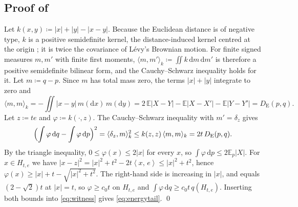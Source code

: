 \documentclass[11pt]{article}
\theoremstyle{plain}
\theoremstyle{definition}
\theoremstyle{remark}
\newcommand{\E}{\mathbb{E}}
\newcommand{\Dd}{\mathrm{d}}
\newcommand{\define}{\coloneqq}
\newcommand{\DE}{D_{\mathrm{E}}}
\newcommand{\IP}[2]{\left\langle #1,\, #2 \right\rangle}
\newcommand{\abs}[1]{\left\lvert #1 \right\rvert}
\begin{document}
\subsection{Proof of \texorpdfstring{}{Lemma 4.22}}
\label{app:energytail}
Let $k(x,y)\define\abs{x}+\abs{y}-\abs{x-y}$. Because the Euclidean distance
is of negative type, $k$ is a positive semidefinite kernel, the
distance-induced kernel centred at the origin \cite{sejdinovic2013equivalence};
it is twice the covariance of L\'evy's Brownian motion. For finite signed measures $m,m'$
with finite first moments, $\langle m,m'\rangle_k\define\iint k\,\Dd m\,\Dd m'$
is therefore a positive semidefinite bilinear form, and the Cauchy--Schwarz
inequality holds for it. Let $m\define q-p$. Since $m$ has total mass zero,
the terms $\abs{x}+\abs{y}$ integrate to zero and
\begin{equation*}
 \langle m,m\rangle_k=-\iint\abs{x-y}\,m(\Dd x)\,m(\Dd y)
 =2\,\E\abs{X-Y}-\E\abs{X-X'}-\E\abs{Y-Y'}=\DE(p,q).
\end{equation*}
Let $z\define te$ and $\varphi\define k(\cdot,z)$. The Cauchy--Schwarz
inequality with $m'=\delta_z$ gives
\begin{equation}
 \Bigl(\int\varphi\,\Dd q-\int\varphi\,\Dd p\Bigr)^{2}
 =\langle\delta_z,m\rangle_k^{2}\le k(z,z)\,\langle m,m\rangle_k=2t\,\DE(p,q).
 \label{eq:witness}
\end{equation}
By the triangle inequality, $0\le\varphi(x)\le2\abs{x}$ for every $x$, so
$\int\varphi\,\Dd p\le2\E_p\abs{X}$. For $x\in H_{t,e}$ we have
$\abs{x-z}^{2}=\abs{x}^{2}+t^{2}-2t\IP{x}{e}\le\abs{x}^{2}+t^{2}$, hence
$\varphi(x)\ge\abs{x}+t-\sqrt{\abs{x}^{2}+t^{2}}$. The right-hand side is
increasing in $\abs{x}$, and equals $(2-\sqrt2)t$ at $\abs{x}=t$, so
$\varphi\ge c_0t$ on $H_{t,e}$ and $\int\varphi\,\Dd q\ge c_0t\,q(H_{t,e})$.
Inserting both bounds into \eqref{eq:witness} gives \eqref{eq:energytail}.
\qed
\end{document}
